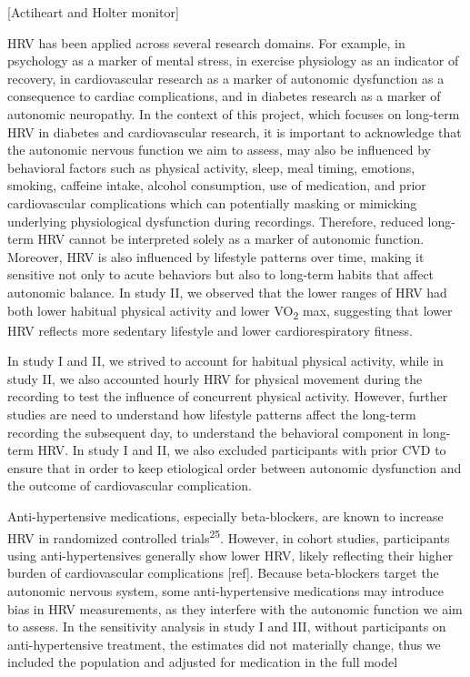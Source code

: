 \documentclass[
  a4paper,
  headsepline=true,
  open=any]{scrbook}
\begin{document}
{[}Actiheart and Holter monitor{]}

HRV has been applied across several research domains. For example, in
psychology as a marker of mental stress, in exercise physiology as an
indicator of recovery, in cardiovascular research as a marker of
autonomic dysfunction as a consequence to cardiac complications, and in
diabetes research as a marker of autonomic neuropathy. In the context of
this project, which focuses on long-term HRV in diabetes and
cardiovascular research, it is important to acknowledge that the
autonomic nervous function we aim to assess, may also be influenced by
behavioral factors such as physical activity, sleep, meal timing,
emotions, smoking, caffeine intake, alcohol consumption, use of
medication, and prior cardiovascular complications which can potentially
masking or mimicking underlying physiological dysfunction during
recordings. Therefore, reduced long-term HRV cannot be interpreted
solely as a marker of autonomic function. Moreover, HRV is also
influenced by lifestyle patterns over time, making it sensitive not only
to acute behaviors but also to long-term habits that affect autonomic
balance. In study II, we observed that the lower ranges of HRV had both
lower habitual physical activity and lower VO\textsubscript{2} max,
suggesting that lower HRV reflects more sedentary lifestyle and lower
cardiorespiratory fitness.

In study I and II, we strived to account for habitual physical activity,
while in study II, we also accounted hourly HRV for physical movement
during the recording to test the influence of concurrent physical
activity. However, further studies are need to understand how lifestyle
patterns affect the long-term recording the subsequent day, to
understand the behavioral component in long-term HRV. In study I and II,
we also excluded participants with prior CVD to ensure that in order to
keep etiological order between autonomic dysfunction and the outcome of
cardiovascular complication.

Anti-hypertensive medications, especially beta-blockers, are known to
increase HRV in randomized controlled trials\textsuperscript{25}.
However, in cohort studies, participants using anti-hypertensives
generally show lower HRV, likely reflecting their higher burden of
cardiovascular complications {[}ref{]}. Because beta-blockers target the
autonomic nervous system, some anti-hypertensive medications may
introduce bias in HRV measurements, as they interfere with the autonomic
function we aim to assess. In the sensitivity analysis in study I and
III, without participants on anti-hypertensive treatment, the estimates
did not materially change, thus we included the population and adjusted
for medication in the full model
\end{document}

